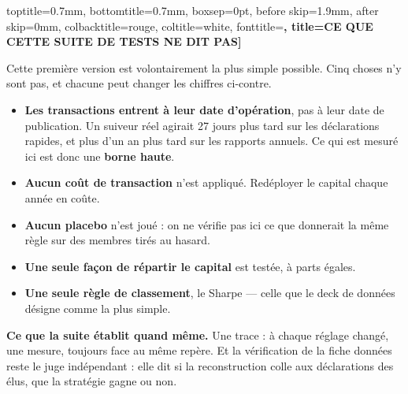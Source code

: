 \documentclass[10pt,a4paper]{article}
\newcommand{\reponse}[1]{{\footnotesize #1\par}\vspace{1.1mm}}
\newcommand{\pts}[1]{{\footnotesize\begin{itemize}#1\end{itemize}}\vspace{0.9mm}}
\begin{document}
{\begin{tcolorbox}
                  toptitle=0.7mm, bottomtitle=0.7mm, boxsep=0pt, before skip=1.9mm, after skip=0mm,
                  colbacktitle=rouge, coltitle=white, fonttitle=\footnotesize\bfseries,
                  title={CE QUE CETTE SUITE DE TESTS NE DIT PAS}]
\reponse{Cette première version est volontairement la plus simple possible. Cinq choses n'y sont pas, et
chacune peut changer les chiffres ci-contre.}
\pts{
\item \textbf{Les transactions entrent à leur date d'opération}, pas à leur date de publication. Un
suiveur réel agirait 27 jours plus tard sur les déclarations rapides, et plus d'un an plus tard sur les
rapports annuels. Ce qui est mesuré ici est donc une \textbf{borne haute}.
\item \textbf{Aucun coût de transaction} n'est appliqué. Redéployer le capital chaque année en coûte.
\item \textbf{Aucun placebo} n'est joué : on ne vérifie pas ici ce que donnerait la même règle sur des
membres tirés au hasard.
\item \textbf{Une seule façon de répartir le capital} est testée, à parts égales.
\item \textbf{Une seule règle de classement}, le Sharpe --- celle que le deck de données désigne comme la plus simple.
}
{\footnotesize\textbf{Ce que la suite établit quand même.} Une trace : à chaque réglage changé, une mesure,
toujours face au même repère. Et la vérification de la fiche données reste le juge indépendant : elle dit
si la reconstruction colle aux déclarations des élus, que la stratégie gagne ou non.}
\end{tcolorbox}}
\vspace{2.5mm}
\end{document}
